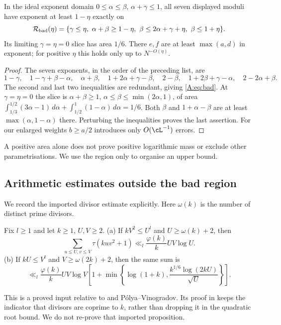 \begin{proposition}\label{M:3.3}
In the ideal exponent domain $0\le\alpha\le\beta$, $\alpha+\gamma\le1$,
all seven displayed moduli have exponent at least $1-\eta$ exactly on
\begin{equation}\label{A:eq:bad}
 \mathcal R_{\rm bad}(\eta)=
 \{\gamma\le\eta,\ \alpha+\beta\ge1-\eta,\
              \beta\le2\alpha+\gamma+\eta,\ \beta\le1+\eta\}.
\end{equation}
Its limiting $\gamma=\eta=0$ slice has area $1/6$. There
$e,f$ are at least $\max(a,d)$ in exponent; for positive $\eta$ this holds
only up to $N^{-O(\eta)}$.
\end{proposition}
\begin{proof}
The seven exponents, in the order of the preceding list, are
\[
 1-\gamma,\quad1-\gamma+\beta-\alpha,\quad\alpha+\beta,\quad
 1+2\alpha+\gamma-\beta,\quad2-\beta,\quad
 1+2\beta+\gamma-\alpha,\quad2-2\alpha+\beta.
\]
The second and last two inequalities are redundant, giving
\eqref{A:eq:bad}. At $\gamma=\eta=0$ the slice is
$\alpha+\beta\ge1$, $\alpha\le\beta\le\min(2\alpha,1)$, of area
$\int_{1/3}^{1/2}(3\alpha-1)\,d\alpha+
\int_{1/2}^1(1-\alpha)\,d\alpha=1/6$.
Both $\beta$ and $1+\alpha-\beta$ are at least
$\max(\alpha,1-\alpha)$ there. Perturbing the inequalities proves the last
assertion. For our enlarged weights $b\ge a/2$ introduces only
$O(\cL^{-1})$ errors.
\end{proof}
A positive area alone does not prove positive logarithmic mass or exclude
other parametrisations. We use the region only to organise an upper bound.

\subsection{Arithmetic estimates outside the bad region}
We record the imported divisor estimate explicitly. Here $\omega(k)$ is
the number of distinct prime divisors.
\begin{proposition}\label{M:2.3}
Fix $l\ge1$ and let $k\ge1$, $U,V\ge2$.
\textup{(a)} If $kV^2\le U^l$ and $U\ge\omega(k)+2$, then
\[
 \sum_{u\le U,v\le V}\tau(kuv^2+1)
       \ll_l\frac{\varphi(k)}kUV\log U.
\]
\textup{(b)} If $kU\le V^l$ and $V\ge\omega(2k)+2$, then the same sum is
\[
 \ll_l\frac{\varphi(k)}kUV\log V
 \left[1+\min\left\{\log(1+k),
              \frac{k^{1/6}\log(2kU)}{\sqrt U}\right\}\right].
\]
\end{proposition}
This is a proved input relative to \cite[Theorem~7.1, Corollary~7.4]{ET}
and P\'olya--Vinogradov. Its proof in \cite[\S2]{MN3} keeps the indicator
that divisors are coprime to $k$, rather than dropping it in the quadratic
root bound. We do not re-prove that imported proposition.

